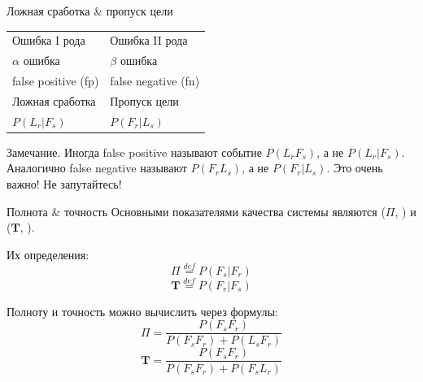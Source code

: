   \begin{frame}{Ложная сработка \& пропуск цели} 
	\begin{center}
		\LARGE
		\begin{tabular}{l|l}
			Ошибка I рода & Ошибка II рода \\
			$\alpha$ ошибка & $\beta$ ошибка \\
			false positive (fp) & false negative (fn) \\ 
			Ложная сработка  & Пропуск цели \\
			$P(L_r|F_s)$ & $P(F_r |L_s)$\\
		\end{tabular}
	\end{center}
	
	\begin{block}{Замечание.}
		Иногда false positive называют событие $P(L_r F_s)$, а не $P(L_r | F_s)$.
		Аналогично false negative называют $P(F_r  L_s)$, а не $P(F_r | L_s)$.
		Это очень важно! Не запутайтесь!
	\end{block}
\end{frame}



\begin{frame}{Полнота \& точность}\label{frame:presicion_recall}
	\small
	Основными показателями качества системы являются 
	 ($\Pi$, ) 
	и 
	 ($\boldsymbol T$, ).
	
	Их определения:
	\begin{equation}\label{eq:recall_def}
	\Pi \stackrel{def}{=} P(F_s | F_r)
	\end{equation}
	\begin{equation}\label{eq:precision_def}
	\boldsymbol T \stackrel{def}{=} P(F_r | F_s)
	\end{equation}
	
	Полноту и точность можно вычислить через формулы:
	\begin{equation}\label{eq:recall_calc}
	\Pi = \frac{P(F_s  F_r)}{P(F_s F_r) + P(L_s F_r)}
	\end{equation}
	\begin{equation}\label{eq:precision_calc}
	\boldsymbol T = \frac{P(F_s F_r)}{P(F_s F_r) + P(F_s L_r)}
	\end{equation}
	
\end{frame}

